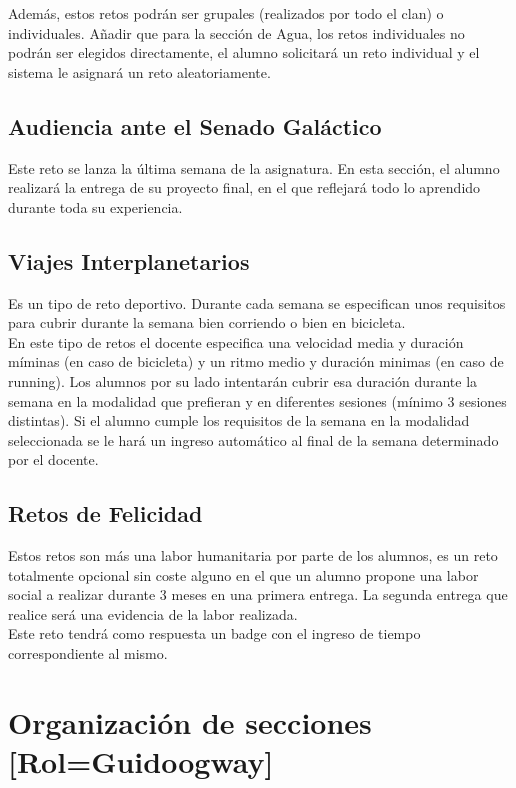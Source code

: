 Además, estos retos podrán ser grupales (realizados por todo el clan) o individuales. Añadir que para la sección de Agua, los retos individuales no podrán ser elegidos directamente, el alumno solicitará un reto individual y el sistema le asignará un reto aleatoriamente.

\subsection{Audiencia ante el Senado Galáctico}
Este reto se lanza la última semana de la asignatura. En esta sección, el alumno realizará la entrega de su proyecto final, en el que reflejará todo lo aprendido durante toda su experiencia.

\subsection{Viajes Interplanetarios}
Es un tipo de reto deportivo. Durante cada semana se especifican unos requisitos para cubrir durante la semana bien corriendo o bien en bicicleta.\\

En este tipo de retos el docente especifica una velocidad media y duración míminas (en caso de bicicleta) y un ritmo medio y duración minimas (en caso de running). Los alumnos por su lado intentarán cubrir esa duración durante la semana en la modalidad que prefieran y en diferentes sesiones (mínimo 3 sesiones distintas). Si el alumno cumple los requisitos de la semana en la modalidad seleccionada se le hará un ingreso automático al final de la semana determinado por el docente.

\subsection{Retos de Felicidad}
Estos retos son más una labor humanitaria por parte de los alumnos, es un reto totalmente opcional sin coste alguno en el que un alumno propone una labor social a realizar durante 3 meses en una primera entrega. La segunda entrega que realice será una evidencia de la labor realizada.\\

Este reto tendrá como respuesta un badge con el ingreso de tiempo correspondiente al mismo.

\newpage

\section{Organización de secciones [Rol=Guidoogway]}


